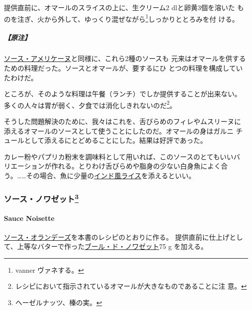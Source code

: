 \begin{recette}
提供直前に、オマールのスライスの上に、生クリーム2 dlと卵黄3個を溶いた
ものを注ぎ、火から外して、ゆっくり混ぜながら\footnote{vanner
  ヴァネする。}しっかりととろみを付 ける。

\hypertarget{ux539fux6ce8-15}{%
\subparagraph{【原注】}\label{ux539fux6ce8-15}}

\protect\hyperlink{sauce-americaine}{ソース・アメリケーヌ}と同様に、これら2種のソースも
元来はオマールを供するための料理だった。ソースとオマールが、要するにひ
とつの料理を構成していたわけだ。

ところが、そのような料理は午餐（ランチ）でしか提供することが出来ない。
多くの人々は胃が弱く、夕食では消化しきれないのだ\footnote{レシピにおいて指示されているオマールが大きなものであることに注
  意。}。

そうした問題解決のために、我々はこれを、舌びらめのフィレやムスリーヌに
添えるオマールのソースとして使うことにしたのだ。オマールの身はガルニ
チュールとして添えるにとどめることにした。結果は好評であった。

カレー粉やパプリカ粉末を調味料として用いれば、このソースのとてもいいバ
リエーションが作れる。とりわけ舌びらめや脂身の少ない白身魚によく合
う。\ldots{}\ldots{}その場合、魚に少量の\protect\hyperlink{riz-a-l-indienne}{インド風ライス}を添えるといい。

\maeaki

\hypertarget{ux30bdux30fcux30b9ux30ceux30efux30bcux30c3ux30c8102}{%
\subsubsection[ソース・ノワゼット]{\texorpdfstring{ソース・ノワゼット\footnote{ヘーゼルナッツ、榛の実。}}{ソース・ノワゼット}}\label{ux30bdux30fcux30b9ux30ceux30efux30bcux30c3ux30c8102}}

\hypertarget{sauce-noisette}{%
\paragraph{Sauce Noisette}\label{sauce-noisette}}


\protect\hyperlink{sauce-hollandaise}{ソース・オランデーズ}を本書のレシピのとおりに作る。
提供直前に仕上げとして、上等なバターで作った\protect\hyperlink{}{ブール・ド・ノワゼット}75
g を加える。


\end{recette}
